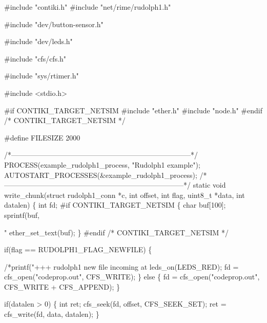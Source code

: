 \begin{DoxyCodeInclude}
\textcolor{preprocessor}{#include "contiki.h"}
\textcolor{preprocessor}{#include "net/rime/rudolph1.h"}

\textcolor{preprocessor}{#include "dev/button-sensor.h"}

\textcolor{preprocessor}{#include "dev/leds.h"}

\textcolor{preprocessor}{#include "cfs/cfs.h"}

\textcolor{preprocessor}{#include "sys/rtimer.h"}

\textcolor{preprocessor}{#include <stdio.h>}

\textcolor{preprocessor}{#if CONTIKI\_TARGET\_NETSIM}
\textcolor{preprocessor}{#include "ether.h"}
\textcolor{preprocessor}{#include "node.h"}
\textcolor{preprocessor}{#endif }\textcolor{comment}{/* CONTIKI\_TARGET\_NETSIM */}\textcolor{preprocessor}{}

\textcolor{preprocessor}{#define FILESIZE 2000}

\textcolor{comment}{/*---------------------------------------------------------------------------*/}
PROCESS(example\_rudolph1\_process, \textcolor{stringliteral}{"Rudolph1 example"});
AUTOSTART\_PROCESSES(&example\_rudolph1\_process);
\textcolor{comment}{/*---------------------------------------------------------------------------*/}
\textcolor{keyword}{static} \textcolor{keywordtype}{void}
write\_chunk(\textcolor{keyword}{struct} rudolph1\_conn *c, \textcolor{keywordtype}{int} offset, \textcolor{keywordtype}{int} flag,
            uint8\_t *data, \textcolor{keywordtype}{int} datalen)
\{
  \textcolor{keywordtype}{int} fd;
\textcolor{preprocessor}{#if CONTIKI\_TARGET\_NETSIM}
  \{
    \textcolor{keywordtype}{char} buf[100];
    sprintf(buf, \textcolor{stringliteral}{"%
    ether\_set\_text(buf);
  \}
\textcolor{preprocessor}{#endif }\textcolor{comment}{/* CONTIKI\_TARGET\_NETSIM */}\textcolor{preprocessor}{}

  \textcolor{keywordflow}{if}(flag == RUDOLPH1\_FLAG\_NEWFILE) \{
    \textcolor{comment}{/*printf("+++ rudolph1 new file incoming at %
    leds\_on(LEDS\_RED);
    fd = cfs\_open(\textcolor{stringliteral}{"codeprop.out"}, CFS\_WRITE);
  \} \textcolor{keywordflow}{else} \{
    fd = cfs\_open(\textcolor{stringliteral}{"codeprop.out"}, CFS\_WRITE + CFS\_APPEND);
  \}
  
  \textcolor{keywordflow}{if}(datalen > 0) \{
    \textcolor{keywordtype}{int} ret;
    cfs\_seek(fd, offset, CFS\_SEEK\_SET);
    ret = cfs\_write(fd, data, datalen);
  \}

}}
\end{DoxyCodeInclude}
